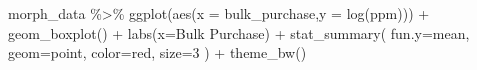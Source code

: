 \documentclass[
  11pt,
]{article}
\newenvironment{Shaded}{\begin{snugshade}}{\end{snugshade}}
\newcommand{\AttributeTok}[1]{\textcolor[rgb]{0.77,0.63,0.00}{#1}}
\newcommand{\DecValTok}[1]{\textcolor[rgb]{0.00,0.00,0.81}{#1}}
\newcommand{\FunctionTok}[1]{\textcolor[rgb]{0.00,0.00,0.00}{#1}}
\newcommand{\NormalTok}[1]{#1}
\newcommand{\SpecialCharTok}[1]{\textcolor[rgb]{0.00,0.00,0.00}{#1}}
\newcommand{\StringTok}[1]{\textcolor[rgb]{0.31,0.60,0.02}{#1}}
\begin{document}
\begin{Shaded}
\begin{Highlighting}[]
\NormalTok{morph\_data }\SpecialCharTok{\%\textgreater{}\%}
  \FunctionTok{ggplot}\NormalTok{(}\FunctionTok{aes}\NormalTok{(}\AttributeTok{x =}\NormalTok{ bulk\_purchase,}\AttributeTok{y =} \FunctionTok{log}\NormalTok{(ppm))) }\SpecialCharTok{+}
  \FunctionTok{geom\_boxplot}\NormalTok{() }\SpecialCharTok{+}
  \FunctionTok{labs}\NormalTok{(}\AttributeTok{x=}\StringTok{\textquotesingle{}Bulk Purchase\textquotesingle{}}\NormalTok{) }\SpecialCharTok{+}
  \FunctionTok{stat\_summary}\NormalTok{(}
    \AttributeTok{fun.y=}\NormalTok{mean,}
    \AttributeTok{geom=}\StringTok{\textquotesingle{}point\textquotesingle{}}\NormalTok{,}
    \AttributeTok{color=}\StringTok{\textquotesingle{}red\textquotesingle{}}\NormalTok{,}
    \AttributeTok{size=}\DecValTok{3}
\NormalTok{  ) }\SpecialCharTok{+}
  \FunctionTok{theme\_bw}\NormalTok{()}
\end{Highlighting}
\end{Shaded}
\end{document}
